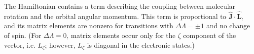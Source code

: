 The Hamiltonian contains a term describing the coupling between molecular rotation and the orbital angular momentum. This term is proportional to $\widehat{\mathbf J}\mathbin{\cdot}\widehat{\mathbf L}$, and its matrix elements are nonzero for transitions with $\Delta\Lambda=\pm1$ and no change of spin. (For $\Delta\Lambda=0$, matrix elements occur only for the $\zeta$ component of the vector, i.e. $L_\zeta$; however, $L_\zeta$ is diagonal in the electronic states.)
